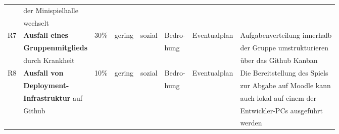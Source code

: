 \begin{table}[H]
\begin{tabular}{|c|l|l|l|l|l|l|l|}
        & der Minispielhalle &  &  & & &  &  \\
        & wechselt &  &  &  &  & & \\
        \hline
        R7 & \textbf{Ausfall eines} & 30\% & gering & sozial & Bedro- & Eventualplan & Aufgabenverteilung innerhalb \\
        & \textbf{Gruppenmitglieds} & & &  & hung &  & der Gruppe umstrukturieren \\
        & durch Krankheit &  &  &  & & & über das Github Kanban \\
        \hline
        R8 & \textbf{Ausfall von} & 10\% & gering & sozial & Bedro- & Eventualplan & Die Bereitstellung des Spiels \\
        & \textbf{Deployment-} &  &  && hung &  & zur Abgabe auf Moodle kann \\
        & \textbf{Infrastruktur} auf & & &  &  &  & auch lokal auf einem der \\
        & Github &  &  &  & & & Entwickler-PCs ausgeführt \\
        &  &  &  &  & & & werden \\
        \hline
    \end{tabular}
\normalsize
\end{table}